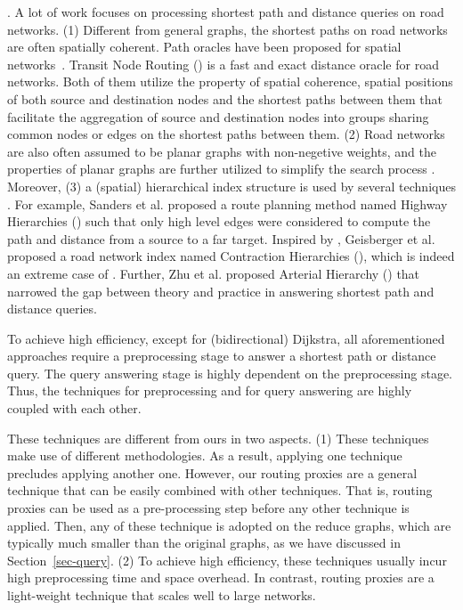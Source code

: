 .
 A lot of work focuses on processing shortest path and distance queries on road networks. (1) Different from general graphs, the shortest paths on road networks are often spatially coherent. Path oracles have been proposed for spatial networks~\cite{SankaranarayananSA09}. Transit Node Routing (\tnr) \cite{arz2013transit} is a fast and exact distance oracle for road networks. Both of them utilize the property of spatial coherence, \ie spatial positions of both source and destination nodes and the shortest paths between them that facilitate the aggregation of source and destination nodes into groups sharing common nodes or edges on the shortest paths between them. (2) Road networks are also often assumed to be planar graphs with non-negetive weights, and the properties of planar graphs are further utilized to simplify the search process \cite{fakcharoenphol2006planar,gupta2004roads,klein2010shortest,MozesS12}. Moreover, (3) a (spatial) hierarchical index structure is used by several techniques \cite{SandersS05, GeisbergerSSD08, zhu2013shortest}. For example, Sanders et al. \cite{SandersS05} proposed a route planning method named Highway Hierarchies (\hh) such that only high level edges were considered to compute the path and distance from a source to a far target. Inspired by \hh, Geisberger et al. \cite{GeisbergerSSD08} proposed a road network index named Contraction Hierarchies (\ch), which is indeed an extreme case of \hh. Further, Zhu et al. \cite{zhu2013shortest} proposed Arterial Hierarchy (\ah) that narrowed the gap between theory and practice in answering shortest path and distance queries.

To achieve high efficiency, except for (bidirectional) Dijkstra, all aforementioned approaches require a preprocessing stage to answer a shortest path or distance query. The query answering stage is highly dependent on the preprocessing stage. Thus, the techniques for preprocessing and for query answering are highly coupled with each other.
 
These techniques are different from ours in two aspects. (1) These techniques make use of different methodologies. As a result, applying one technique precludes applying another one. However, our routing proxies are a general technique that can be easily combined with other techniques. That is, routing proxies can be used as a pre-processing step before any other technique is applied.  Then, any of these technique is adopted on the reduce graphs, which are typically much smaller than the original graphs, as we have discussed in Section~\ref{sec-query}. (2)  To achieve high efficiency, these techniques usually incur high preprocessing time and space overhead. In contrast, routing proxies are a light-weight technique that scales well to large networks.


